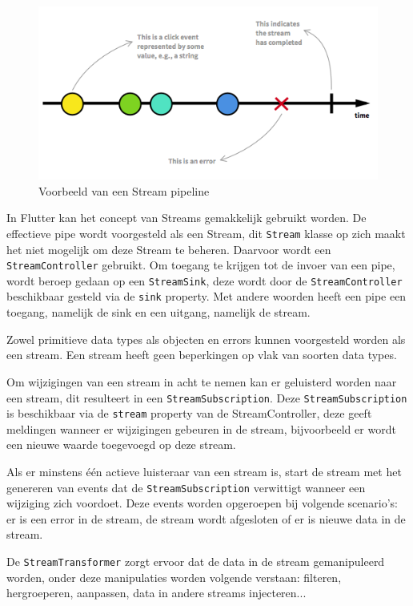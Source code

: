 \begin{figure}[H]
    \centering
    \includegraphics[width=\figureWidthModifier\linewidth]{img/stand-van-zaken/stream-pipeline.png}
    \caption{Voorbeeld van een Stream pipeline}
    \label{fig:stream-pipeline}
\end{figure}

In Flutter kan het concept van Streams gemakkelijk gebruikt worden. De effectieve pipe wordt voorgesteld als een Stream, dit \verb|Stream| klasse op zich maakt het niet mogelijk om deze Stream te beheren.
Daarvoor wordt een \verb|StreamController| gebruikt. Om toegang te krijgen tot de invoer van een pipe, wordt beroep gedaan op een \verb|StreamSink|, deze wordt door de \verb|StreamController| beschikbaar gesteld via de \verb|sink| property.
Met andere woorden heeft een pipe een toegang, namelijk de sink en een uitgang, namelijk de stream.

Zowel primitieve data types als objecten en errors kunnen voorgesteld worden als een stream. Een stream heeft geen beperkingen op vlak van soorten data types.

Om wijzigingen van een stream in acht te nemen kan er geluisterd worden naar een stream, dit resulteert in een \verb|StreamSubscription|. Deze \verb|StreamSubscription| is beschikbaar via de \verb|stream| property van de StreamController, deze geeft meldingen wanneer er wijzigingen gebeuren in de stream, bijvoorbeeld er wordt een nieuwe waarde toegevoegd op deze stream.

Als er minstens één actieve luisteraar van een stream is, start de stream met het genereren van events dat de \verb|StreamSubscription| verwittigt wanneer een wijziging zich voordoet. Deze events worden opgeroepen bij volgende scenario's: er is een error in de stream, de stream wordt afgesloten of er is nieuwe data in de stream.

De \verb|StreamTransformer| zorgt ervoor dat de data in de stream gemanipuleerd worden, onder deze manipulaties worden volgende verstaan: filteren, hergroeperen, aanpassen, data in andere streams injecteren...

